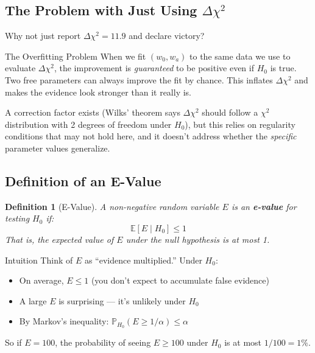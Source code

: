 \documentclass[11pt,a4paper]{article}
\newtheorem{definition}{Definition}
\newcommand{\E}{\mathbb{E}}
\newcommand{\Prob}{\mathbb{P}}
\begin{document}
\subsection{The Problem with Just Using $\Delta\chi^2$}

Why not just report $\Delta\chi^2 = 11.9$ and declare victory?

\begin{warningbox}{The Overfitting Problem}
When we fit $(w_0, w_a)$ to the same data we use to evaluate $\Delta\chi^2$, the improvement is \textit{guaranteed} to be positive even if $H_0$ is true. Two free parameters can always improve the fit by chance. This inflates $\Delta\chi^2$ and makes the evidence look stronger than it really is.

A correction factor exists (Wilks' theorem says $\Delta\chi^2$ should follow a $\chi^2$ distribution with 2 degrees of freedom under $H_0$), but this relies on regularity conditions that may not hold here, and it doesn't address whether the \textit{specific} parameter values generalize.
\end{warningbox}

\subsection{Definition of an E-Value}

\begin{definition}[E-Value]
A non-negative random variable $E$ is an \textbf{e-value} for testing $H_0$ if:
\begin{equation}
\boxed{\E[E \mid H_0] \leq 1}
\end{equation}
That is, the expected value of $E$ under the null hypothesis is at most 1.
\end{definition}

\begin{conceptbox}{Intuition}
Think of $E$ as ``evidence multiplied.'' Under $H_0$:
\begin{itemize}
    \item On average, $E \leq 1$ (you don't expect to accumulate false evidence)
    \item A large $E$ is surprising --- it's unlikely under $H_0$
    \item By Markov's inequality: $\Prob_{H_0}(E \geq 1/\alpha) \leq \alpha$
\end{itemize}
So if $E = 100$, the probability of seeing $E \geq 100$ under $H_0$ is at most $1/100 = 1\%$.
\end{conceptbox}
\end{document}

